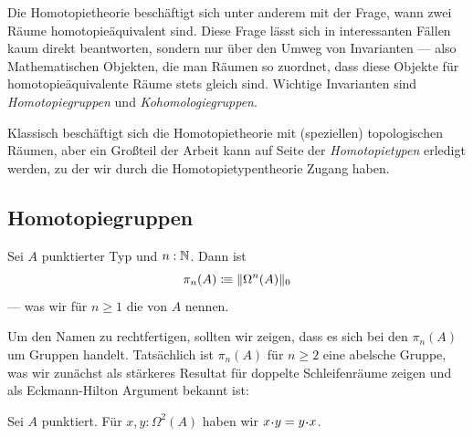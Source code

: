 
Die Homotopietheorie beschäftigt sich unter anderem mit der Frage,
wann zwei Räume homotopieäquivalent sind.
Diese Frage lässt sich in interessanten Fällen kaum direkt beantworten,
sondern nur über den Umweg von Invarianten --- also Mathematischen Objekten,
die man Räumen so zuordnet, dass diese Objekte für homotopieäquivalente Räume stets gleich sind.
Wichtige Invarianten sind \emph{Homotopiegruppen} und \emph{Kohomologiegruppen}.

Klassisch beschäftigt sich die Homotopietheorie mit (speziellen) topologischen Räumen,
aber ein Großteil der Arbeit kann auf Seite der \emph{Homotopietypen} erledigt werden,
zu der wir durch die Homo\-to\-pie\-ty\-pen\-theo\-rie Zugang haben.

\subsection{Homotopiegruppen}

\begin{definition}
  Sei \(A\) punktierter Typ und \(n:\mathbb{N}\).
  Dann ist
  \[\pi_n(A)\vcentcolon\mspace{-1.2mu}\equiv \|\Omega^n(A)\|_0\]
  --- was wir für \(n\geq 1\) die  von \(A\) nennen.
\end{definition}

Um den Namen zu rechtfertigen, sollten wir zeigen, dass es sich bei den \(\pi_n(A)\) um Gruppen handelt.
Tatsächlich ist \(\pi_n(A)\) für \(n\geq 2\) eine abelsche Gruppe, was wir zunächst als stärkeres Resultat für doppelte Schleifenräume zeigen und als Eckmann-Hilton Argument bekannt ist:

\begin{lemma}
  \label{eckmann-hilton}
  Sei \(A\) punktiert. Für \(x,y:\Omega^2(A)\) haben wir \(x\kon y=y\kon x\).
\end{lemma}

